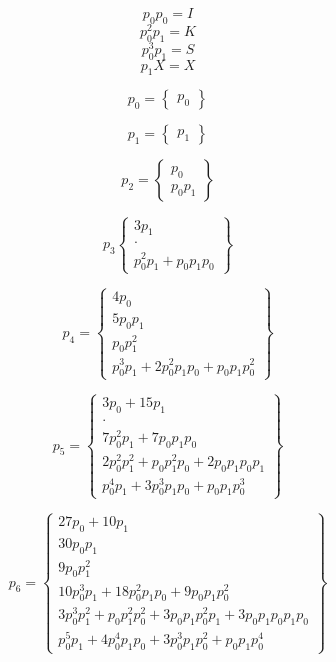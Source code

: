 \documentclass[a4paper,12pt]{article}
\numberwithin{definition}{section}
\numberwithin{lemma}{section}
\numberwithin{proposition}{section}
\numberwithin{theorem}{section}
\numberwithin{grammar}{section}
\numberwithin{program}{section}
\numberwithin{convention}{section}
\numberwithin{corollary}{section}
\numberwithin{principle}{section}
\begin{document}
$$p_0 p_0 = I$$
$$p_0^2 p_1 = K$$
$$p_0^3 p_1 = S$$
$$p_1 X = X$$

$$p_0 = \begin{Bmatrix} p_0 \end{Bmatrix}$$

$$p_1 = \begin{Bmatrix} p_1 \end{Bmatrix}$$

$$p_2 = \begin{Bmatrix}  p_0 \\  p_0 p_1 \end{Bmatrix}$$

$$p_3 \begin{Bmatrix} 3 p_1 \\ \cdot \\ p_0^2 p_1 + p_0 p_1 p_0 \end{Bmatrix}$$

$$
p_4 = \begin{Bmatrix} 4 p_0 \\ 5 p_0 p_1 \\ p_0 p_1^2 \\ p_0^3 p_1 + 2 p_0^2 p_1 p_0 + p_0 p_1 p_0^2 \end{Bmatrix}
$$

$$
p_5 =\begin{Bmatrix} 3 p_0 + 15 p_1 \\ \cdot \\ 7 p_0^2 p_1 + 7 p_0 p_1 p_0 \\ 2 p_0^2 p_1^2 + p_0 p_1^2 p_0 + 2 p_0 p_1 p_0 p_1 \\ p_0^4 p_1 + 3 p_0^3 p_1 p_0 + p_0 p_1 p_0^3 \end{Bmatrix}
$$

$$
p_6 = \begin{Bmatrix} 27 p_0 + 10 p_1 \\ 30 p_0 p_1 \\ 9 p_0 p_1^2 \\ 10 p_0^3 p_1 + 18 p_0^2 p_1 p_0 + 9 p_0 p_1 p_0^2 \\ 3 p_0^3 p_1^2 + p_0 p_1^2 p_0^2 + 3 p_0 p_1 p_0^2 p_1 + 3 p_0 p_1 p_0 p_1 p_0 \\ p_0^5 p_1 + 4 p_0^4 p_1 p_0 + 3 p_0^3 p_1 p_0^2 + p_0 p_1 p_0^4 \end{Bmatrix}
$$
\end{document}
